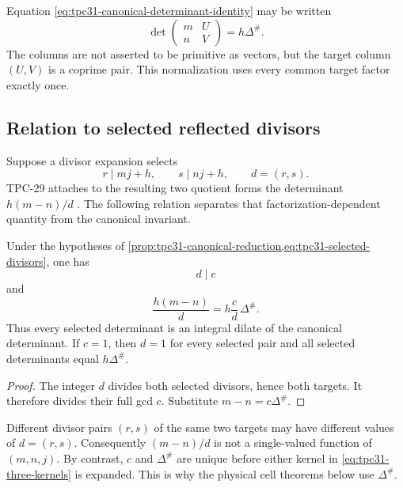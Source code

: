 \begin{remark}
\label{rem:tpc31-coprime-pair-determinant}
Equation \eqref{eq:tpc31-canonical-determinant-identity} may be written
\[
 \det\begin{pmatrix}m&U\\ n&V\end{pmatrix}
 =h\Delta^\#.
\]
The columns are not asserted to be primitive as vectors, but the
target column $(U,V)$ is a coprime pair.  This normalization uses every
common target factor exactly once.
\end{remark}

\subsection{Relation to selected reflected divisors}

Suppose a divisor expansion selects
\begin{equation}
 r\mid mj+h,\qquad s\mid nj+h,\qquad d=(r,s).
 \label{eq:tpc31-selected-divisors}
\end{equation}
TPC-29 attaches to the resulting two quotient forms the determinant
$h(m-n)/d$ \citep{WangTPC29}.  The following relation separates that
factorization-dependent quantity from the canonical invariant.

\begin{proposition}
\label{prop:tpc31-selected-dilate}
Under the hypotheses of
\cref{prop:tpc31-canonical-reduction,eq:tpc31-selected-divisors},
one has
\begin{equation}
 d\mid c
 \label{eq:tpc31-selected-content-divides-full}
\end{equation}
and
\begin{equation}
 \boxed{
 \frac{h(m-n)}d
 =h\frac cd\,\Delta^\#.}
 \label{eq:tpc31-selected-determinant-dilate}
\end{equation}
Thus every selected determinant is an integral dilate of the
canonical determinant.  If $c=1$, then $d=1$ for every selected pair
and all selected determinants equal $h\Delta^\#$.
\end{proposition}

\begin{proof}
The integer $d$ divides both selected divisors, hence both targets.
It therefore divides their full gcd $c$.  Substitute
$m-n=c\Delta^\#$.
\end{proof}

\begin{remark}
\label{rem:tpc31-selected-not-canonical}
Different divisor pairs $(r,s)$ of the same two targets may have
different values of $d=(r,s)$.  Consequently $(m-n)/d$ is not a
single-valued function of $(m,n,j)$.  By contrast, $c$ and
$\Delta^\#$ are unique before either kernel in
\eqref{eq:tpc31-three-kernels} is expanded.  This is why the physical
cell theorems below use $\Delta^\#$.
\end{remark}

